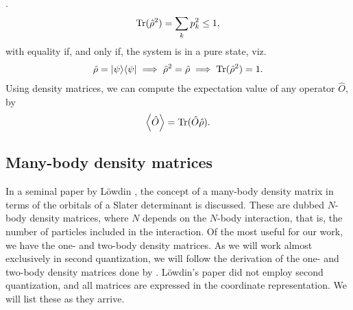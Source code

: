         \cite{modern-qm}.
        \begin{align}
            \operatorname{Tr}(\hat{\rho}^2) = \sum_{k} p_k^2 \leq 1,
        \end{align}
        with equality if, and only if, the system is in a pure state, viz.
        \begin{align}
            \hat{\rho} = | \psi \rangle\langle \psi |
            \implies \hat{\rho}^2 = \hat{\rho}
            \implies \operatorname{Tr}(\hat{\rho}^2) = 1.
        \end{align}
        Using density matrices, we can compute the expectation value of any
        operator $\hat{O}$, by \cite{modern-qm}
        \begin{align}
            \left\langle \hat{O} \right\rangle = \operatorname{Tr}(\hat{O}\hat{\rho}).
        \end{align}

        \subsection{Many-body density matrices}
            In a seminal paper by Löwdin \cite{lowdin-density-matrices}, the
            concept of a many-body density matrix in terms of the orbitals of a
            Slater determinant is discussed. These are dubbed $N$-body density
            matrices, where $N$ depends on the $N$-body interaction, that is,
            the number of particles included in the interaction. Of the most
            useful for our work, we have the one- and two-body density matrices.
            As we will work almost exclusively in second quantization, we will
            follow the derivation of the one- and two-body density matrices done
            by \citeauthor{helgaker-molecular}. Löwdin's paper
            \cite{lowdin-density-matrices} did not employ second quantization,
            and all matrices are expressed in the coordinate representation. We
            will list these as they arrive.
